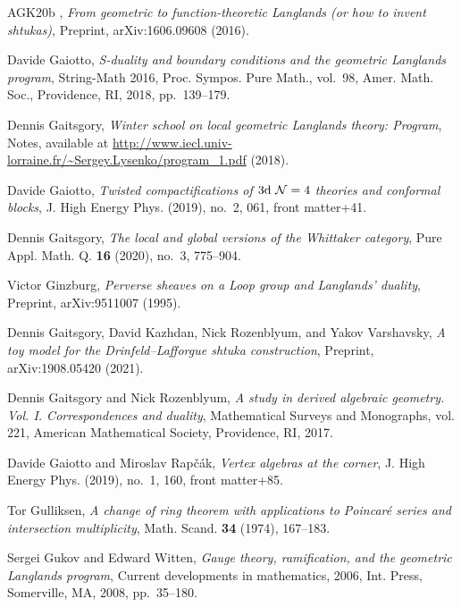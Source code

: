 \begin{thebibliography}{AGK{\etalchar{+}}20b}
\bysame, \emph{From geometric to function-theoretic {L}anglands (or how to
  invent shtukas)}, Preprint, arXiv:1606.09608 (2016).

Davide Gaiotto, \emph{S-duality and boundary conditions and the geometric
  {L}anglands program}, String-{M}ath 2016, Proc. Sympos. Pure Math., vol.~98,
  Amer. Math. Soc., Providence, RI, 2018, pp.~139--179.

Dennis Gaitsgory, \emph{Winter school on local geometric {L}anglands theory:
  {P}rogram}, Notes, available at
  \url{http://www.iecl.univ-lorraine.fr/~Sergey.Lysenko/program_1.pdf} (2018).

Davide Gaiotto, \emph{Twisted compactifications of {$3{\rm d}\ \mathcal N=4$}
  theories and conformal blocks}, J. High Energy Phys. (2019), no.~2, 061,
  front matter+41.

Dennis Gaitsgory, \emph{The local and global versions of the {W}hittaker
  category}, Pure Appl. Math. Q. \textbf{16} (2020), no.~3, 775--904.

Victor Ginzburg, \emph{Perverse sheaves on a {L}oop group and {L}anglands'
  duality}, Preprint, arXiv:9511007 (1995).

Dennis Gaitsgory, David Kazhdan, Nick Rozenblyum, and Yakov Varshavsky, \emph{A
  toy model for the {D}rinfeld--{L}afforgue shtuka construction}, Preprint,
  arXiv:1908.05420 (2021).

Dennis Gaitsgory and Nick Rozenblyum, \emph{A study in derived algebraic
  geometry. {V}ol. {I}. {C}orrespondences and duality}, Mathematical Surveys
  and Monographs, vol. 221, American Mathematical Society, Providence, RI,
  2017.

Davide Gaiotto and Miroslav Rap\v{c}\'{a}k, \emph{Vertex algebras at the
  corner}, J. High Energy Phys. (2019), no.~1, 160, front matter+85.

Tor Gulliksen, \emph{A change of ring theorem with applications to
  {P}oincar\'{e} series and intersection multiplicity}, Math. Scand.
  \textbf{34} (1974), 167--183.

Sergei Gukov and Edward Witten, \emph{Gauge theory, ramification, and the
  geometric {L}anglands program}, Current developments in mathematics, 2006,
  Int. Press, Somerville, MA, 2008, pp.~35--180.


\end{thebibliography}
